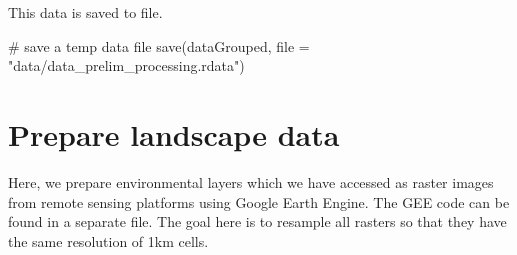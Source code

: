 \documentclass[]{article}
\newenvironment{Shaded}{}{}
\newcommand{\CommentTok}[1]{\textcolor[rgb]{0.00,0.50,0.00}{#1}}
\newcommand{\ControlFlowTok}[1]{\textcolor[rgb]{0.00,0.00,1.00}{#1}}
\newcommand{\DataTypeTok}[1]{#1}
\newcommand{\DecValTok}[1]{#1}
\newcommand{\KeywordTok}[1]{\textcolor[rgb]{0.00,0.00,1.00}{#1}}
\newcommand{\NormalTok}[1]{#1}
\newcommand{\OperatorTok}[1]{#1}
\newcommand{\OtherTok}[1]{\textcolor[rgb]{1.00,0.25,0.00}{#1}}
\newcommand{\StringTok}[1]{\textcolor[rgb]{0.00,0.50,0.50}{#1}}
\begin{document}
\begin{Shaded}
\end{Shaded}

This data is saved to file.

\begin{Shaded}
\begin{Highlighting}[]

\CommentTok{# save a temp data file}
\KeywordTok{save}\NormalTok{(dataGrouped, }\DataTypeTok{file =} \StringTok{"data/data_prelim_processing.rdata"}\NormalTok{)}
\end{Highlighting}
\end{Shaded}

\hypertarget{prepare-landscape-data}{%
\section{Prepare landscape data}\label{prepare-landscape-data}}

Here, we prepare environmental layers which we have accessed as raster images from remote sensing platforms using Google Earth Engine.
The GEE code can be found in a separate file.
The goal here is to resample all rasters so that they have the same resolution of 1km cells.
\end{document}
